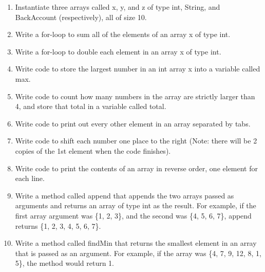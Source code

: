 \setcounter{counter}{1}
\begin{enumerate}[label={\arabic{counter}\addtocounter{counter}{1}}.]

\item Instantiate three arrays called x, y, and z of type int, String, and BackAccount (respectively), all of size 10.

\item Write a for-loop to sum all of the elements of an array x of type int.

\item Write a for-loop to double each element in an array x of type int.

\item Write code to store the largest number in an int array x into a variable called max.

\item Write code to count how many numbers in the array are strictly larger than 4, and store that total in a variable called total.

\item Write code to print out every other element in an array separated by tabs.

\item Write code to shift each number one place to the right (Note: there will be 2 copies of the 1st element when the code finishes).

\item Write code to print the contents of an array in reverse order, one element for each line.

\item Write a method called append that appends the two arrays passed as arguments and returns an array of type int as the result. For example, if the first array argument was \{1, 2, 3\}, and the second was \{4, 5, 6, 7\}, append returns \{1, 2, 3, 4, 5, 6, 7\}.

\item Write a method called findMin that returns the smallest element in an array that is passed as an argument. For example, if the array was \{4, 7, 9, 12, 8, 1, 5\}, the method would return 1.

\end{enumerate}